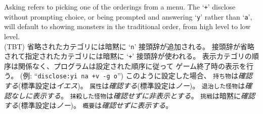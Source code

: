 Asking refers to picking one of the orderings from a menu.
The `{\tt +}' disclose without prompting choice,
or being prompted and answering `{\tt y}' rather than `{\tt a}',
will default to showing monsters in the traditional order,
from high level to low level.\\
(TBT)
省略されたカテゴリには暗黙に `{\tt n}' 接頭辞が追加される。
接頭辞が省略されて指定されたカテゴリには暗黙に `{\tt +}' 接頭辞が使われる。
表示カテゴリの順序は関係なく、プログラムは設定された順序に従って
ゲーム終了時の表示を行う。
(例: ``{\tt disclose:yi na +v -g o}'')
このように設定した場合、
{\tt 持ち物}は{\it 確認する\/}(標準設定は{\it イエス\/})。
{\tt 属性}は{\it 確認する\/}(標準設定は{\it ノー\/})。
{\tt 退治した怪物}は{\it 確認なしに表示する\/}。
{\tt 抹殺した怪物}は{\it 確認せずに非表示とする\/}。
{\tt 挑戦}は暗黙に{\it 確認する\/}(標準設定は{\it ノー\/})。
{\tt 概要}は{\it 確認せずに表示する\/}。

